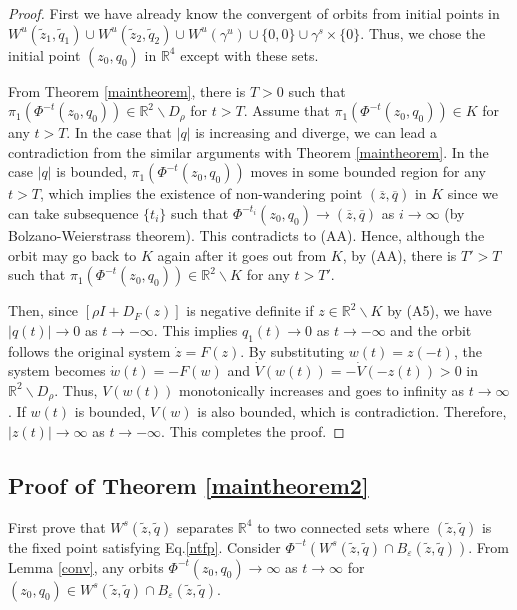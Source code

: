 \documentclass[11pt,reqno]{amsart}
\begin{document}
\begin{proof}
First we have already know the convergent of orbits from initial points in $W^u(\tilde{z}_1,\tilde{q}_1)\cup W^u(\tilde{z}_2,\tilde{q}_2)\cup W^u(\gamma^u)\cup\{0,0\}\cup\gamma^s\times\{0\}$. Thus, we chose the initial point $(z_0,q_0)$ in $\mathbb{R}^4$ except with these sets. 

From Theorem \ref{maintheorem}, there is $T>0$ such that $\pi_1(\Phi^{-t}(z_0,q_0))\in \mathbb{R}^2\backslash D_\rho$ for $t>T$. Assume that $\pi_1(\Phi^{-t}(z_0,q_0))\in K$ for any $t>T$. In the case that $|q|$ is increasing and diverge, we can lead a contradiction from the similar arguments with Theorem \ref{maintheorem}. In the case $|q|$ is bounded, $\pi_1(\Phi^{-t}(z_0,q_0))$ moves in some bounded region for any $t>T$, which implies the existence of non-wandering point $(\overline{z},\overline{q})$ in $K$ since we can take subsequence $\{t_i\}$ such that $\Phi^{-t_i}(z_0,q_0)\to(\overline{z},\overline{q})$ as $i\to\infty$ (by Bolzano-Weierstrass theorem). This contradicts to (AA). Hence, although the orbit may go back to $K$ again after it goes out from $K$, by (AA), there is $T'>T$ such that $\pi_1(\Phi^{-t}(z_0,q_0))\in\mathbb{R}^2\backslash K$ for any $t>T'$.  

Then, since $[\rho I + D_F(z)]$ is negative definite if $z\in\mathbb{R}^2\backslash K$ by (A5), we have $|q(t)|\to 0$ as $t\to-\infty$. This implies $q_1(t)\to 0$ as $t\to-\infty$ and the orbit follows the original system $\dot{z}=F(z)$. By substituting $w(t)=z(-t)$, the system becomes $\dot{w}(t)=-F(w)$ and $\dot{V}(w(t))=-\dot{V}(-z(t))>0$ in $\mathbb{R}^2\backslash D_\rho$. Thus, $V(w(t))$ monotonically increases and goes to infinity as $t\to\infty$. If $w(t)$ is bounded, $V(w)$ is also bounded, which is contradiction. Therefore, $|z(t)|\to\infty$ as $t\to -\infty$. This completes the proof.
\end{proof}



\subsection*{\bf Proof of Theorem \ref{maintheorem2}}

First prove that $W^s(\tilde{z},\tilde{q})$ separates $\mathbb{R}^4$ to two connected sets where $(\tilde{z},\tilde{q})$ is the fixed point satisfying Eq.\eqref{ntfp}. Consider $\Phi^{-t}(W^s(\tilde{z},\tilde{q})\cap B_\varepsilon(\tilde{z},\tilde{q}))$. From Lemma \ref{conv}, any orbits $\Phi^{-t}(z_0,q_0)\to\infty$ as $t\to\infty$ for $(z_0,q_0)\in W^s(\tilde{z},\tilde{q})\cap B_\varepsilon(\tilde{z},\tilde{q})$. 
\end{document}
